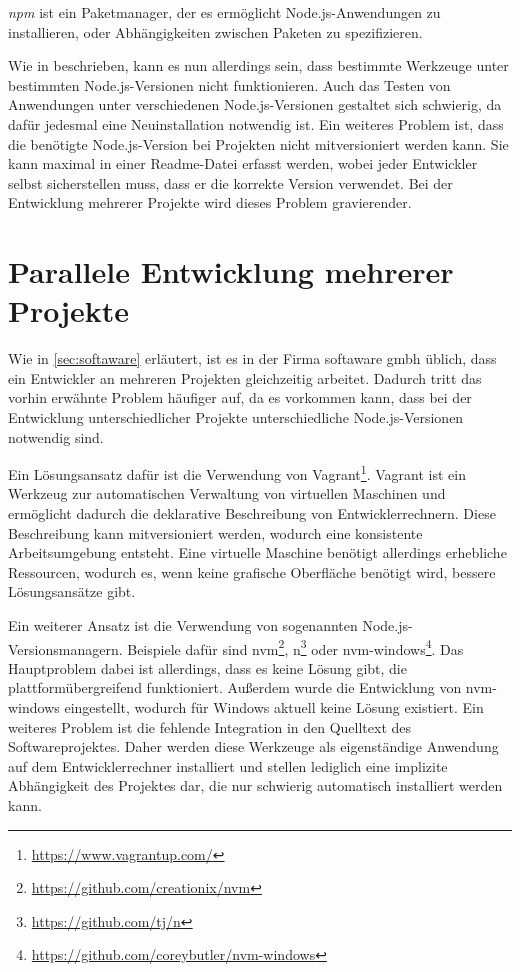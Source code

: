 \emph{npm} ist ein Paketmanager, der es ermöglicht Node.js-Anwendungen zu installieren, oder Abhängigkeiten zwischen Paketen zu spezifizieren.

Wie in \autocite{Papa.n:online} beschrieben, kann es nun allerdings sein, dass bestimmte Werkzeuge unter bestimmten Node.js-Versionen nicht funktionieren.
Auch das Testen von Anwendungen unter verschiedenen Node.js-Versionen gestaltet sich schwierig, da dafür jedesmal eine Neuinstallation notwendig ist.
Ein weiteres Problem ist, dass die benötigte Node.js-Version bei Projekten nicht mitversioniert werden kann.
Sie kann maximal in einer Readme-Datei erfasst werden, wobei jeder Entwickler selbst sicherstellen muss, dass er die korrekte Version verwendet.
Bei der Entwicklung mehrerer Projekte wird dieses Problem gravierender.


\section{Parallele Entwicklung mehrerer Projekte}
Wie in \cref{sec:softaware} erläutert, ist es in der Firma softaware gmbh üblich, dass ein Entwickler an mehreren Projekten gleichzeitig arbeitet.
Dadurch tritt das vorhin erwähnte Problem häufiger auf, da es vorkommen kann, dass bei der Entwicklung unterschiedlicher Projekte unterschiedliche Node.js-Versionen notwendig sind.

Ein Lösungsansatz dafür ist die Verwendung von Vagrant\footnote{\url{https://www.vagrantup.com/}}. 
Vagrant ist ein Werkzeug zur automatischen Verwaltung von virtuellen Maschinen und ermöglicht dadurch die deklarative Beschreibung von Entwicklerrechnern.
Diese Beschreibung kann mitversioniert werden, wodurch eine konsistente Arbeitsumgebung entsteht.
Eine virtuelle Maschine benötigt allerdings erhebliche Ressourcen, wodurch es, wenn keine grafische Oberfläche benötigt wird, bessere Lösungsansätze gibt.

Ein weiterer Ansatz ist die Verwendung von sogenannten Node.js-Versionsmanagern.
Beispiele dafür sind nvm\footnote{\url{https://github.com/creationix/nvm}}, n\footnote{\url{https://github.com/tj/n}} oder nvm-windows\footnote{\url{https://github.com/coreybutler/nvm-windows}}.
Das Hauptproblem dabei ist allerdings, dass es keine Lösung gibt, die plattformübergreifend funktioniert.
Außerdem wurde die Entwicklung von nvm-windows eingestellt, wodurch für Windows aktuell keine Lösung existiert.
Ein weiteres Problem ist die fehlende Integration in den Quelltext des Softwareprojektes.
Daher werden diese Werkzeuge als eigenständige Anwendung auf dem Entwicklerrechner installiert und stellen lediglich eine implizite Abhängigkeit des Projektes dar, die nur schwierig automatisch installiert werden kann.

